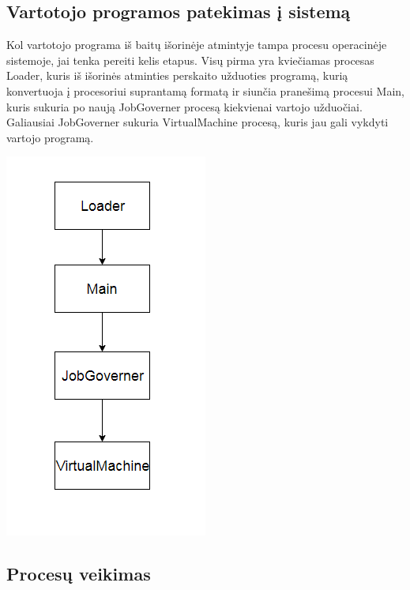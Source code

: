 \documentclass{scrartcl}
\begin{document}
      \subsection{Vartotojo programos patekimas į sistemą}
        Kol vartotojo programa iš baitų išorinėje atmintyje tampa procesu operacinėje sistemoje, jai tenka pereiti kelis etapus. Visų pirma yra kviečiamas procesas Loader, kuris iš išorinės atminties perskaito užduoties programą, kurią konvertuoja į procesoriui suprantamą formatą ir siunčia pranešimą procesui Main, kuris sukuria po naują JobGoverner procesą kiekvienai vartojo užduočiai. Galiausiai JobGoverner sukuria VirtualMachine procesą, kuris jau gali vykdyti vartojo programą.
        \begin{center}
          \includegraphics[scale=1]{Program_load}
        \end{center}

      \subsection{Procesų veikimas}
\end{document}
